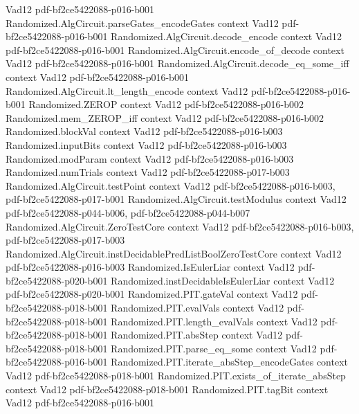 \begin{theorem}
  {Vad12}
  {pdf-bf2ce5422088-p016-b001}
\proofstep
  {Randomized.AlgCircuit.parseGates_encodeGates}
  {context}
  {Vad12}
  {pdf-bf2ce5422088-p016-b001}
\proofstep
  {Randomized.AlgCircuit.decode_encode}
  {context}
  {Vad12}
  {pdf-bf2ce5422088-p016-b001}
\proofstep
  {Randomized.AlgCircuit.encode_of_decode}
  {context}
  {Vad12}
  {pdf-bf2ce5422088-p016-b001}
\proofstep
  {Randomized.AlgCircuit.decode_eq_some_iff}
  {context}
  {Vad12}
  {pdf-bf2ce5422088-p016-b001}
\proofstep
  {Randomized.AlgCircuit.lt_length_encode}
  {context}
  {Vad12}
  {pdf-bf2ce5422088-p016-b001}
\proofstep
  {Randomized.ZEROP}
  {context}
  {Vad12}
  {pdf-bf2ce5422088-p016-b002}
\proofstep
  {Randomized.mem_ZEROP_iff}
  {context}
  {Vad12}
  {pdf-bf2ce5422088-p016-b002}
\proofstep
  {Randomized.blockVal}
  {context}
  {Vad12}
  {pdf-bf2ce5422088-p016-b003}
\proofstep
  {Randomized.inputBits}
  {context}
  {Vad12}
  {pdf-bf2ce5422088-p016-b003}
\proofstep
  {Randomized.modParam}
  {context}
  {Vad12}
  {pdf-bf2ce5422088-p016-b003}
\proofstep
  {Randomized.numTrials}
  {context}
  {Vad12}
  {pdf-bf2ce5422088-p017-b003}
\proofstep
  {Randomized.AlgCircuit.testPoint}
  {context}
  {Vad12}
  {pdf-bf2ce5422088-p016-b003,
    pdf-bf2ce5422088-p017-b001}
\proofstep
  {Randomized.AlgCircuit.testModulus}
  {context}
  {Vad12}
  {pdf-bf2ce5422088-p044-b006,
    pdf-bf2ce5422088-p044-b007}
\proofstep
  {Randomized.AlgCircuit.ZeroTestCore}
  {context}
  {Vad12}
  {pdf-bf2ce5422088-p016-b003,
    pdf-bf2ce5422088-p017-b003}
\proofstep
  {Randomized.AlgCircuit.instDecidablePredListBoolZeroTestCore}
  {context}
  {Vad12}
  {pdf-bf2ce5422088-p016-b003}
\proofstep
  {Randomized.IsEulerLiar}
  {context}
  {Vad12}
  {pdf-bf2ce5422088-p020-b001}
\proofstep
  {Randomized.instDecidableIsEulerLiar}
  {context}
  {Vad12}
  {pdf-bf2ce5422088-p020-b001}
\proofstep
  {Randomized.PIT.gateVal}
  {context}
  {Vad12}
  {pdf-bf2ce5422088-p018-b001}
\proofstep
  {Randomized.PIT.evalVals}
  {context}
  {Vad12}
  {pdf-bf2ce5422088-p018-b001}
\proofstep
  {Randomized.PIT.length_evalVals}
  {context}
  {Vad12}
  {pdf-bf2ce5422088-p018-b001}
\proofstep
  {Randomized.PIT.absStep}
  {context}
  {Vad12}
  {pdf-bf2ce5422088-p018-b001}
\proofstep
  {Randomized.PIT.parse_eq_some}
  {context}
  {Vad12}
  {pdf-bf2ce5422088-p016-b001}
\proofstep
  {Randomized.PIT.iterate_absStep_encodeGates}
  {context}
  {Vad12}
  {pdf-bf2ce5422088-p018-b001}
\proofstep
  {Randomized.PIT.exists_of_iterate_absStep}
  {context}
  {Vad12}
  {pdf-bf2ce5422088-p018-b001}
\proofstep
  {Randomized.PIT.tagBit}
  {context}
  {Vad12}
  {pdf-bf2ce5422088-p016-b001}

\end{theorem}
